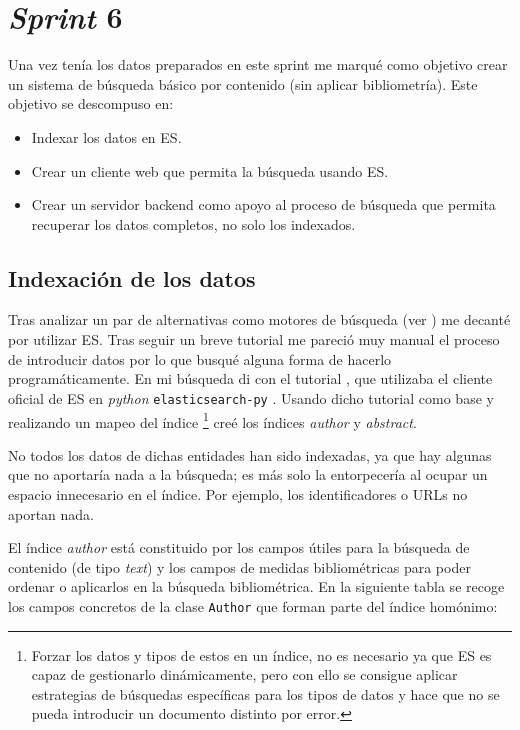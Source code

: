 \section{\textit{Sprint} 6}
Una vez tenía los datos preparados en este sprint me marqué como objetivo crear un sistema de búsqueda básico por contenido (sin aplicar bibliometría). Este objetivo se descompuso en:
\begin{itemize}
	\item Indexar los datos en \acrlong{ES}.
	\item Crear un cliente web que permita la búsqueda usando \acrshort{ES}.
	\item Crear un servidor \gls{backend} como apoyo al proceso de búsqueda que permita recuperar los datos completos, no solo los indexados.
\end{itemize}

\subsection{Indexación de los datos}
Tras analizar un par de alternativas como motores de búsqueda (ver ) me decanté por utilizar \acrshort{ES}. Tras seguir un breve tutorial me pareció muy manual el proceso de introducir datos por lo que busqué alguna forma de hacerlo programáticamente. En mi búsqueda di con el tutorial \cite{indexingES}, que utilizaba el cliente oficial de \acrshort{ES} en \textit{python} \texttt{elasticsearch-py} \cite{ES_client}. Usando dicho tutorial como base y realizando un mapeo del índice \footnote[4]{Forzar los datos y tipos de estos en un índice, no es necesario ya que \acrshort{ES} es capaz de gestionarlo dinámicamente, pero con ello se consigue aplicar estrategias de búsquedas específicas para los tipos de datos y hace que no se pueda introducir un documento distinto por error.}\cite{mappingES} creé los índices \textit{author} y \textit{abstract}.

No todos los datos de dichas entidades han sido indexadas, ya que hay algunas que no aportaría nada a la búsqueda; es más solo la entorpecería al ocupar un espacio innecesario en el índice. Por ejemplo, los identificadores o \acrshort{URL}s no aportan nada.

El índice \textit{author} está constituido por los campos útiles para la búsqueda de contenido (de tipo \textit{text}) y los campos de medidas bibliométricas para poder ordenar o aplicarlos en la búsqueda bibliométrica. En la siguiente tabla se recoge los campos concretos de la clase \texttt{Author} que forman parte del índice homónimo:

